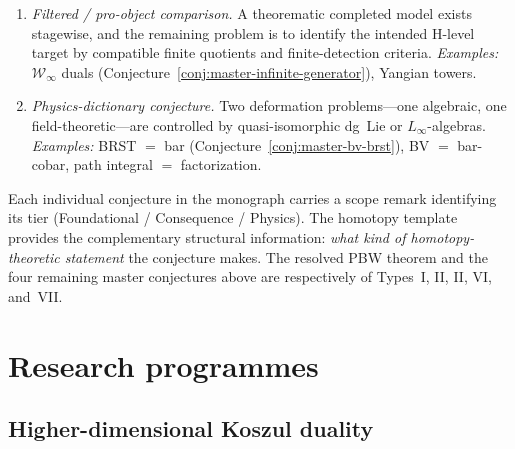 \begin{convention}
\begin{enumerate}[label=\textbf{Type \Roman*.}, leftmargin=3em]
\item \emph{Filtered / pro-object comparison.}
  A theorematic completed model exists stagewise, and the remaining
  problem is to identify the intended H-level target by compatible
  finite quotients and finite-detection criteria.
  \emph{Examples:} $\mathcal{W}_\infty$ duals
  (Conjecture~\ref{conj:master-infinite-generator}),
  Yangian towers.

\item \emph{Physics-dictionary conjecture.}
  Two deformation problems---one algebraic, one
  field-theoretic---are controlled by quasi-isomorphic dg~Lie or
  $L_\infty$-algebras.
  \emph{Examples:} BRST $=$ bar
  (Conjecture~\ref{conj:master-bv-brst}),
  BV $=$ bar-cobar, path integral $=$ factorization.
\end{enumerate}
\end{convention}

\begin{remark}\label{rem:template-usage}
Each individual conjecture in the monograph carries a scope remark
identifying its tier (Foundational / Consequence / Physics).
The homotopy template provides the complementary structural
information: \emph{what kind of homotopy-theoretic statement}
the conjecture makes.  The resolved PBW theorem and the four remaining
master conjectures above are respectively of Types~I, II, II, VI,
and~VII.
\end{remark}

\section{Research programmes}
\label{sec:research-programmes}

\subsection{Higher-dimensional Koszul duality}
\label{subsec:higher-dim-kd}

